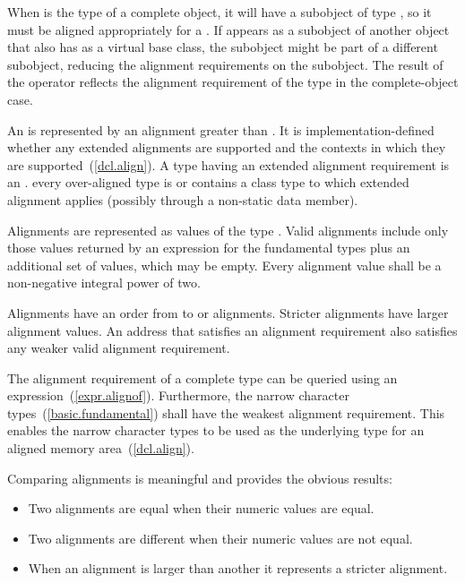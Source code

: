 When  is the type of a complete object, it will have a subobject of
type , so it must be aligned appropriately for a .
If  appears as a subobject of another object that also has 
as a virtual base class, the  subobject might be part of a different
subobject, reducing the alignment requirements on the  subobject.
\exitexample The result of the  operator reflects the alignment
requirement of the type in the complete-object case.

\pnum
{}%
%
%
%
An  is represented by an alignment
greater than . It is implementation-defined
whether any extended alignments are supported and the contexts in which they are
supported~(\ref{dcl.align}). A type having an extended alignment
requirement is an . \enternote
every over-aligned type is or contains a class type
to which extended alignment applies (possibly through a non-static data member).
\exitnote

\pnum
Alignments are represented as values of the type .
Valid alignments include only those values returned by an 
expression for the fundamental types plus an additional 
set of values, which may be empty.
Every alignment value shall be a non-negative integral power of two.

\pnum
Alignments have an order from  to
 or  alignments. Stricter
alignments have larger alignment values. An address that satisfies an alignment
requirement also satisfies any weaker valid alignment requirement.

\pnum
The alignment requirement of a complete type can be queried using an
 expression~(\ref{expr.alignof}). Furthermore,
the narrow character types~(\ref{basic.fundamental}) shall have the weakest
alignment requirement.
\enternote This enables the narrow character types to be used as the
underlying type for an aligned memory area~(\ref{dcl.align}).\exitnote

\pnum
Comparing alignments is meaningful and provides the obvious results:

\begin{itemize}
\item Two alignments are equal when their numeric values are equal.
\item Two alignments are different when their numeric values are not equal.
\item When an alignment is larger than another it represents a stricter alignment.
\end{itemize}

